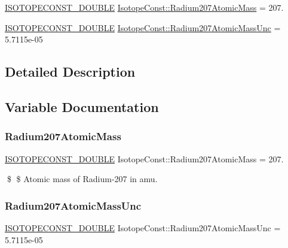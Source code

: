 \begin{DoxyCompactItemize}
\item 
\mbox{\hyperlink{group___isotope_const-_macros_ga8f45a7272ce02c0b4c65c44636ed719a}{I\+S\+O\+T\+O\+P\+E\+C\+O\+N\+S\+T\+\_\+\+D\+O\+U\+B\+LE}} \mbox{\hyperlink{group___isotope_const-_radium-_ra207_ga83afdffaf14ee5548e7d32aed3cd652a}{Isotope\+Const\+::\+Radium207\+Atomic\+Mass}} = 207.
\item 
\mbox{\hyperlink{group___isotope_const-_macros_ga8f45a7272ce02c0b4c65c44636ed719a}{I\+S\+O\+T\+O\+P\+E\+C\+O\+N\+S\+T\+\_\+\+D\+O\+U\+B\+LE}} \mbox{\hyperlink{group___isotope_const-_radium-_ra207_gaa81a669195d1acd8ad518d26befa96c3}{Isotope\+Const\+::\+Radium207\+Atomic\+Mass\+Unc}} = 5.\+7115e-\/05
\end{DoxyCompactItemize}


\subsection{Detailed Description}


\subsection{Variable Documentation}
\mbox{\label{group___isotope_const-_radium-_ra207_ga83afdffaf14ee5548e7d32aed3cd652a}} 
\subsubsection{\texorpdfstring{Radium207\+Atomic\+Mass}{Radium207AtomicMass}}
{\footnotesize\ttfamily \mbox{\hyperlink{group___isotope_const-_macros_ga8f45a7272ce02c0b4c65c44636ed719a}{I\+S\+O\+T\+O\+P\+E\+C\+O\+N\+S\+T\+\_\+\+D\+O\+U\+B\+LE}} Isotope\+Const\+::\+Radium207\+Atomic\+Mass = 207.}

\$ \$ Atomic mass of Radium-\/207 in amu. \mbox{\label{group___isotope_const-_radium-_ra207_gaa81a669195d1acd8ad518d26befa96c3}} 
\subsubsection{\texorpdfstring{Radium207\+Atomic\+Mass\+Unc}{Radium207AtomicMassUnc}}
{\footnotesize\ttfamily \mbox{\hyperlink{group___isotope_const-_macros_ga8f45a7272ce02c0b4c65c44636ed719a}{I\+S\+O\+T\+O\+P\+E\+C\+O\+N\+S\+T\+\_\+\+D\+O\+U\+B\+LE}} Isotope\+Const\+::\+Radium207\+Atomic\+Mass\+Unc = 5.\+7115e-\/05}

